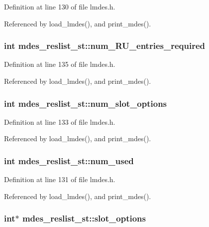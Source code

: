 Definition at line 130 of file lmdes.h.

Referenced by load\_\-lmdes(), and print\_\-mdes().
\subsubsection{\setlength{\rightskip}{0pt plus 5cm}int \bf{mdes\_\-reslist\_\-st::num\_\-RU\_\-entries\_\-required}}\label{structmdes__reslist__st_1634c9a64a39b575dcf28eeb4b50ebe0}




Definition at line 135 of file lmdes.h.

Referenced by load\_\-lmdes(), and print\_\-mdes().
\subsubsection{\setlength{\rightskip}{0pt plus 5cm}int \bf{mdes\_\-reslist\_\-st::num\_\-slot\_\-options}}\label{structmdes__reslist__st_22eaf9f6bb6bcd1e4b04b06c8ee97473}




Definition at line 133 of file lmdes.h.

Referenced by load\_\-lmdes(), and print\_\-mdes().
\subsubsection{\setlength{\rightskip}{0pt plus 5cm}int \bf{mdes\_\-reslist\_\-st::num\_\-used}}\label{structmdes__reslist__st_3670ca7576ddda3a83becceabf550c44}




Definition at line 131 of file lmdes.h.

Referenced by load\_\-lmdes(), and print\_\-mdes().
\subsubsection{\setlength{\rightskip}{0pt plus 5cm}int$\ast$ \bf{mdes\_\-reslist\_\-st::slot\_\-options}}\label{structmdes__reslist__st_94a471e0074383d2e9c63227e65aed69}




